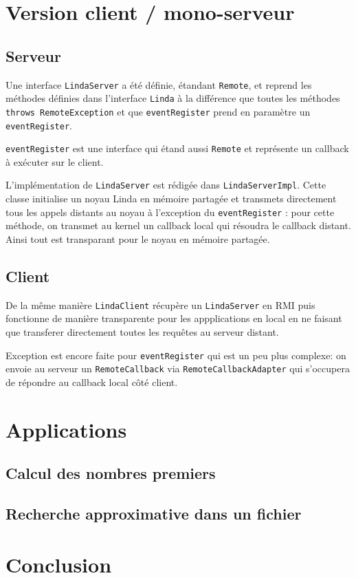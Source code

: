 \documentclass[headings=standardclasses,parskip=half]{scrartcl}
\begin{document}
\section{Version client / mono-serveur}

\subsection{Serveur}

Une interface \texttt{LindaServer} a été définie, étandant \texttt{Remote},
et reprend les méthodes définies dans l'interface \texttt{Linda} à la
différence que toutes les méthodes \texttt{throws RemoteException} et
que \texttt{eventRegister} prend en paramètre un \texttt{eventRegister}.

\texttt{eventRegister} est une interface qui étand aussi \texttt{Remote}
et représente un callback à exécuter sur le client.

L'implémentation de \texttt{LindaServer} est rédigée dans
\texttt{LindaServerImpl}. Cette classe initialise un noyau Linda en
mémoire partagée et transmets directement tous les appels distants au
noyau à l'exception du \texttt{eventRegister} : pour cette méthode,
on transmet au kernel un callback local qui résoudra le callback distant.
Ainsi tout est transparant pour le noyau en mémoire partagée.

\subsection{Client}

De la même manière \texttt{LindaClient} récupère un \texttt{LindaServer}
en RMI puis fonctionne de manière transparente pour les appplications en
local en ne faisant que transferer directement toutes les requêtes au
serveur distant.

Exception est encore faite pour \texttt{eventRegister} qui est un peu plus
complexe: on envoie au serveur un \texttt{RemoteCallback} via
\texttt{RemoteCallbackAdapter} qui s'occupera de répondre au callback
local côté client.

\section{Applications}

\subsection{Calcul des nombres premiers}

\subsection{Recherche approximative dans un fichier}

\section{Conclusion}
\end{document}

